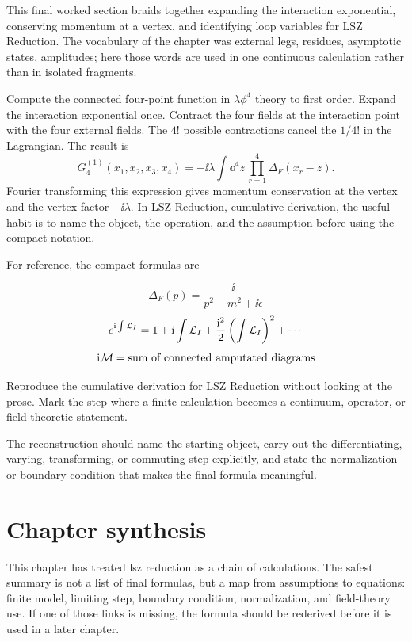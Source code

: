 This final worked section braids together expanding the interaction exponential, conserving momentum at a vertex, and identifying loop variables for LSZ Reduction.  The vocabulary of the chapter was external legs, residues, asymptotic states, amplitudes; here those words are used in one continuous calculation rather than in isolated fragments.

Compute the connected four-point function in \(\lambda\phi^4\) theory to first order.  Expand the interaction exponential once.  Contract the four fields at the interaction point with the four external fields.  The \(4!\) possible contractions cancel the \(1/4!\) in the Lagrangian.  The result is
\[
  G_4^{(1)}(x_1,x_2,x_3,x_4)=
  -\ii\lambda\int\dd^4z\,\prod_{r=1}^4\Delta_F(x_r-z).
\]
Fourier transforming this expression gives momentum conservation at the vertex and the vertex factor \(-\ii\lambda\).  In LSZ Reduction, cumulative derivation, the useful habit is to name the object, the operation, and the assumption before using the compact notation.

For reference, the compact formulas are

\[
  \Delta_F(p)=\frac{\ii}{p^2-m^2+\ii\epsilon}
\]
\[
  e^{\mathrm i\int\mathcal L_I}=1+\mathrm i\int\mathcal L_I+\frac{\mathrm i^2}{2}\left(\int\mathcal L_I\right)^2+\cdots
\]
\[
  \mathrm i\mathcal M=\hbox{sum of connected amputated diagrams}
\]

\begin{exercise}
Reproduce the cumulative derivation for LSZ Reduction without looking at the prose.  Mark the step where a finite calculation becomes a continuum, operator, or field-theoretic statement.
\begin{answer}
The reconstruction should name the starting object, carry out the differentiating, varying, transforming, or commuting step explicitly, and state the normalization or boundary condition that makes the final formula meaningful.
\end{answer}
\end{exercise}



\section{Chapter synthesis}

This chapter has treated lsz reduction as a chain of calculations.  The safest summary is not a list of final formulas, but a map from assumptions to equations: finite model, limiting step, boundary condition, normalization, and field-theory use.  If one of those links is missing, the formula should be rederived before it is used in a later chapter.

